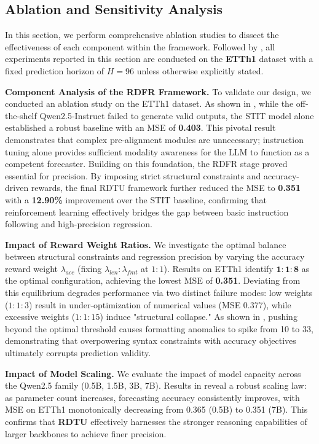 \subsection{Ablation and Sensitivity Analysis}
In this section, we perform comprehensive ablation studies to dissect the effectiveness of each component within the \method{} framework. Followed by \cite{jin2024timellm}, all experiments reported in this section are conducted on the \textbf{ETTh1} dataset with a fixed prediction horizon of $H=96$ unless otherwise explicitly stated.

\noindent\textbf{Component Analysis of the RDFR Framework.}\quad
To validate our design, we conducted an ablation study on the ETTh1 dataset. As shown in , while the off-the-shelf Qwen2.5-Instruct failed to generate valid outputs, the STIT model alone established a robust baseline with an MSE of \textbf{0.403}. This pivotal result demonstrates that complex pre-alignment modules are unnecessary; instruction tuning alone provides sufficient modality awareness for the LLM to function as a competent forecaster. Building on this foundation, the RDFR stage proved essential for precision. By imposing strict structural constraints and accuracy-driven rewards, the final RDTU framework further reduced the MSE to \textbf{0.351} with a \textbf{12.90\%} improvement over the STIT baseline, confirming that reinforcement learning effectively bridges the gap between basic instruction following and high-precision regression.





\noindent\textbf{Impact of Reward Weight Ratios.}\quad
We investigate the optimal balance between structural constraints and regression precision by varying the accuracy reward weight $\lambda_{acc}$ (fixing $\lambda_{len}:\lambda_{fmt}$ at $1:1$). Results on ETTh1 identify $\mathbf{1:1:8}$ as the optimal configuration, achieving the lowest MSE of \textbf{0.351}. Deviating from this equilibrium degrades performance via two distinct failure modes: low weights ($1:1:3$) result in under-optimization of numerical values (MSE 0.377), while excessive weights ($1:1:15$) induce "structural collapse." As shown in , pushing beyond the optimal threshold causes formatting anomalies to spike from 10 to 33, demonstrating that overpowering syntax constraints with accuracy objectives ultimately corrupts prediction validity.

\noindent\textbf{Impact of Model Scaling.}\quad
We evaluate the impact of model capacity across the Qwen2.5 family (0.5B, 1.5B, 3B, 7B). Results in  reveal a robust scaling law: as parameter count increases, forecasting accuracy consistently improves, with MSE on ETTh1 monotonically decreasing from 0.365 (0.5B) to 0.351 (7B). This confirms that \textbf{RDTU} effectively harnesses the stronger reasoning capabilities of larger backbones to achieve finer precision.
